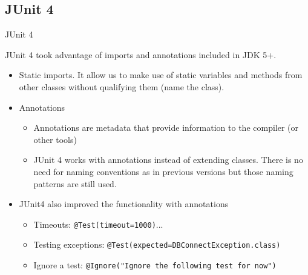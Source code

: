 \documentclass[11pt, xcolor=svgnames]{beamer}
\begin{document}





\subsection{JUnit 4}


\begin{frame}{JUnit 4}

JUnit 4 took advantage of imports and annotations included in JDK 5+.
\begin{itemize}
  \item Static imports. It allow us to make use of static variables and methods from other classes without qualifying them (name the class).
  \item Annotations 
  \begin{itemize}
    \item Annotations are metadata that provide information to the compiler (or other tools)
    \item JUnit 4 works with annotations instead of extending classes. There is no need for naming conventions as in previous versions but those naming patterns are still used. 
  \end{itemize}
  \item JUnit4 also improved the functionality with annotations
  \begin{itemize}
    \item Timeouts: \texttt{@Test(timeout=1000)}...
    \item Testing exceptions: \texttt{@Test(expected=DBConnectException.class)} 
    \item Ignore a test: \texttt{@Ignore("Ignore the following test for now")}
  \end{itemize}
\end{itemize}

\end{frame}
\end{document}
